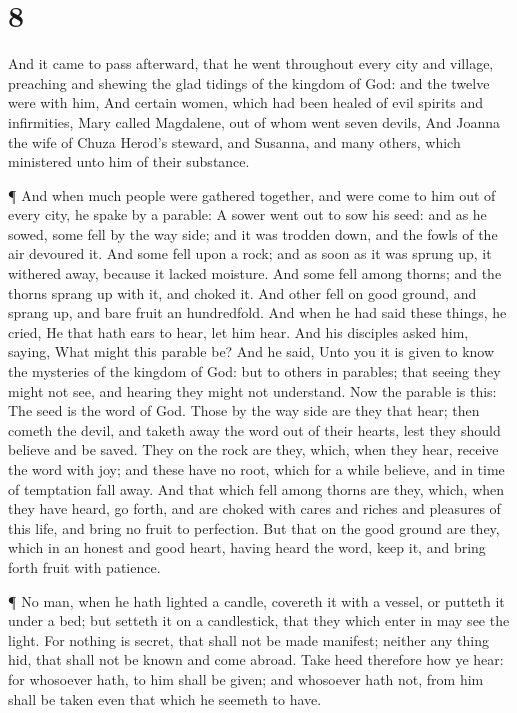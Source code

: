 \hypertarget{section-7}{%
\section{8}\label{section-7}}

 And it came to pass afterward, that he went throughout
every city and village, preaching and shewing the glad tidings of the
kingdom of God: and the twelve were with him,  And certain
women, which had been healed of evil spirits and infirmities, Mary
called Magdalene, out of whom went seven devils,  And Joanna
the wife of Chuza Herod's steward, and Susanna, and many others, which
ministered unto him of their substance.

 ¶ And when much people were gathered together, and were
come to him out of every city, he spake by a parable:  A
sower went out to sow his seed: and as he sowed, some fell by the way
side; and it was trodden down, and the fowls of the air devoured it.
 And some fell upon a rock; and as soon as it was sprung up,
it withered away, because it lacked moisture.  And some fell
among thorns; and the thorns sprang up with it, and choked it.
 And other fell on good ground, and sprang up, and bare
fruit an hundredfold. And when he had said these things, he cried, He
that hath ears to hear, let him hear.  And his disciples
asked him, saying, What might this parable be?  And he
said, Unto you it is given to know the mysteries of the kingdom of God:
but to others in parables; that seeing they might not see, and hearing
they might not understand.  Now the parable is this: The
seed is the word of God.  Those by the way side are they
that hear; then cometh the devil, and taketh away the word out of their
hearts, lest they should believe and be saved.  They on the
rock are they, which, when they hear, receive the word with joy; and
these have no root, which for a while believe, and in time of temptation
fall away.  And that which fell among thorns are they,
which, when they have heard, go forth, and are choked with cares and
riches and pleasures of this life, and bring no fruit to perfection.
 But that on the good ground are they, which in an honest
and good heart, having heard the word, keep it, and bring forth fruit
with patience.

 ¶ No man, when he hath lighted a candle, covereth it with
a vessel, or putteth it under a bed; but setteth it on a candlestick,
that they which enter in may see the light.  For nothing is
secret, that shall not be made manifest; neither any thing hid, that
shall not be known and come abroad.  Take heed therefore
how ye hear: for whosoever hath, to him shall be given; and whosoever
hath not, from him shall be taken even that which he seemeth to have.

